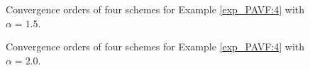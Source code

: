 	
\begin{figure}[H]
	\begin{center}
	\caption{Convergence orders of four schemes for Example \ref{exp_PAVF:4} with $\alpha=1.5$.} \label{fig_PAVF:7}
	\end{center}
	\end{figure}
	
	\begin{figure}[H]
	\begin{center}
	\caption{Convergence orders of four schemes for Example \ref{exp_PAVF:4} with $\alpha=2.0$.} \label{fig_PAVF:8}
	\end{center}
	\end{figure}

